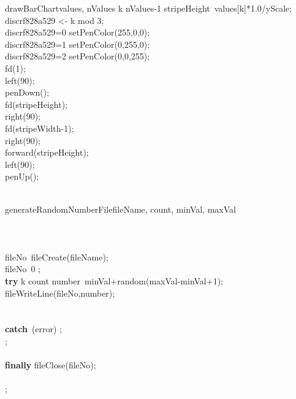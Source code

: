 \documentclass[a4paper,10pt]{article}
\begin{document}
\begin{pseudocode}{drawBarChart}{values, nValues }
  \FOR k  \TO nValues-1  \DO
  \BEGIN
    stripeHeight\gets\ values[k]*1.0/yScale;\\
    discrf828a529 <- k mod 3;\\
    \IF discrf828a529=0 \THEN
      setPenColor(255,0,0);\\
    \ELSEIF discrf828a529=1 \THEN
      setPenColor(0,255,0);\\
    \ELSEIF discrf828a529=2 \THEN
      setPenColor(0,0,255);\\
    fd(1);\\
    left(90);\\
    penDown();\\
    fd(stripeHeight);\\
    right(90);\\
    fd(stripeWidth-1);\\
    right(90);\\
    forward(stripeHeight);\\
    left(90);\\
    penUp();\\
  \END\\
\ENDPROCEDURE
\end{pseudocode}


\begin{pseudocode}{generateRandomNumberFile}{fileName, count, minVal, maxVal }
\label{generateRandomNumberFile}
\\
\\
\\
\\
  fileNo\gets\ fileCreate(fileName);\\
  \IF fileNo\leq\ 0 \THEN
    ;\\
  \textbf{try} \BEGIN
    \FOR k  \TO count  \DO
    \BEGIN
      number\gets\ minVal+random(maxVal-minVal+1);\\
      fileWriteLine(fileNo,number);\\
    \END\\
  \END\\
  \textbf{catch}\ (error)\BEGIN
    ;\\
    ;\\
  \END\\
  \textbf{finally} \BEGIN
    fileClose(fileNo);\\
  \END\\
  ;\\
\ENDPROCEDURE
\end{pseudocode}
\end{document}
